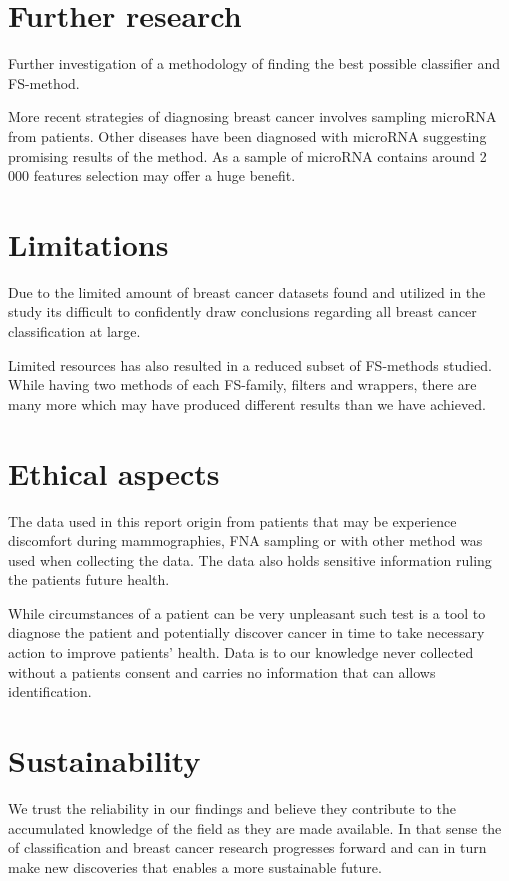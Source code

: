 \section{Further research}

Further investigation of a methodology of finding the best possible classifier and FS-method.

More recent strategies of diagnosing breast cancer involves sampling microRNA from patients. Other diseases have been diagnosed with microRNA suggesting promising results of the method. As a sample of microRNA contains around 2 000 features selection may offer a huge benefit.


\section{Limitations}

Due to the limited amount of breast cancer datasets found and utilized in the study its difficult to confidently draw conclusions regarding all breast cancer classification at large.

Limited resources has also resulted in a reduced subset of FS-methods studied. While having two methods of each FS-family, filters and wrappers, there are many more which may have produced different results than we have achieved.


\section{Ethical aspects}

The data used in this report origin from patients that may be experience discomfort during mammographies, FNA sampling or with other method was used when collecting the data. The data also holds sensitive information ruling the patients future health.

While circumstances of a patient can be very unpleasant such test is a tool to diagnose the patient and potentially discover cancer in time to take necessary action to improve patients' health. Data is to our knowledge never collected without a patients consent and carries no information that can allows identification.

\section{Sustainability}

We trust the reliability in our findings and believe they contribute to the accumulated knowledge of the field as they are made available. In that sense the of classification and breast cancer research progresses forward and can in turn make new discoveries that enables a more sustainable future. 
